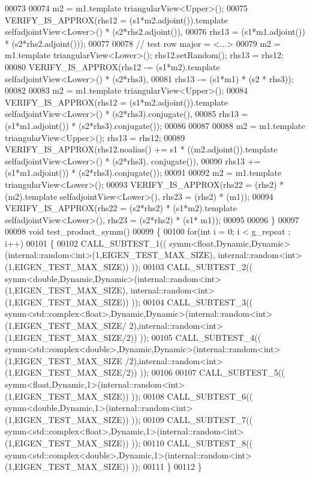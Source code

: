 \begin{DoxyCode}
00073 
00074   m2 = m1.template triangularView<Upper>();
00075   VERIFY\_IS\_APPROX(rhs12 = (s1*m2.adjoint()).\textcolor{keyword}{template} selfadjointView<Lower>() * (s2*rhs2.adjoint()),
00076                    rhs13 = (s1*m1.adjoint()) * (s2*rhs2.adjoint()));
00077 
00078   \textcolor{comment}{// test row major = <...>}
00079   m2 = m1.template triangularView<Lower>(); rhs12.setRandom(); rhs13 = rhs12;
00080   VERIFY\_IS\_APPROX(rhs12 -= (s1*m2).\textcolor{keyword}{template} selfadjointView<Lower>() * (s2*rhs3),
00081                    rhs13 -= (s1*m1) * (s2 * rhs3));
00082 
00083   m2 = m1.template triangularView<Upper>();
00084   VERIFY\_IS\_APPROX(rhs12 = (s1*m2.adjoint()).\textcolor{keyword}{template} selfadjointView<Lower>() * (s2*rhs3).conjugate(),
00085                    rhs13 = (s1*m1.adjoint()) * (s2*rhs3).conjugate());
00086 
00087 
00088   m2 = m1.template triangularView<Upper>(); rhs13 = rhs12;
00089   VERIFY\_IS\_APPROX(rhs12.noalias() += s1 * ((m2.adjoint()).\textcolor{keyword}{template} selfadjointView<Lower>() * (s2*rhs3).
      conjugate()),
00090                    rhs13 += (s1*m1.adjoint()) * (s2*rhs3).conjugate());
00091 
00092   m2 = m1.template triangularView<Lower>();
00093   VERIFY\_IS\_APPROX(rhs22 = (rhs2) * (m2).\textcolor{keyword}{template} selfadjointView<Lower>(), rhs23 = (rhs2) * (m1));
00094   VERIFY\_IS\_APPROX(rhs22 = (s2*rhs2) * (s1*m2).\textcolor{keyword}{template} selfadjointView<Lower>(), rhs23 = (s2*rhs2) * (s1*
      m1));
00095 
00096 \}
00097 
00098 \textcolor{keywordtype}{void} test\_product\_symm()
00099 \{
00100   \textcolor{keywordflow}{for}(\textcolor{keywordtype}{int} i = 0; i < g\_repeat ; i++)
00101   \{
00102     CALL\_SUBTEST\_1(( symm<float,Dynamic,Dynamic>(internal::random<int>(1,EIGEN\_TEST\_MAX\_SIZE),
      internal::random<int>(1,EIGEN\_TEST\_MAX\_SIZE)) ));
00103     CALL\_SUBTEST\_2(( symm<double,Dynamic,Dynamic>(internal::random<int>(1,EIGEN\_TEST\_MAX\_SIZE),
      internal::random<int>(1,EIGEN\_TEST\_MAX\_SIZE)) ));
00104     CALL\_SUBTEST\_3(( symm<std::complex<float>,Dynamic,Dynamic>(internal::random<int>(1,EIGEN\_TEST\_MAX\_SIZE/
      2),internal::random<int>(1,EIGEN\_TEST\_MAX\_SIZE/2)) ));
00105     CALL\_SUBTEST\_4(( symm<std::complex<double>,Dynamic,Dynamic>(internal::random<int>(1,EIGEN\_TEST\_MAX\_SIZE
      /2),internal::random<int>(1,EIGEN\_TEST\_MAX\_SIZE/2)) ));
00106 
00107     CALL\_SUBTEST\_5(( symm<float,Dynamic,1>(internal::random<int>(1,EIGEN\_TEST\_MAX\_SIZE)) ));
00108     CALL\_SUBTEST\_6(( symm<double,Dynamic,1>(internal::random<int>(1,EIGEN\_TEST\_MAX\_SIZE)) ));
00109     CALL\_SUBTEST\_7(( symm<std::complex<float>,Dynamic,1>(internal::random<int>(1,EIGEN\_TEST\_MAX\_SIZE)) ));
00110     CALL\_SUBTEST\_8(( symm<std::complex<double>,Dynamic,1>(internal::random<int>(1,EIGEN\_TEST\_MAX\_SIZE)) ));
00111   \}
00112 \}
\end{DoxyCode}
